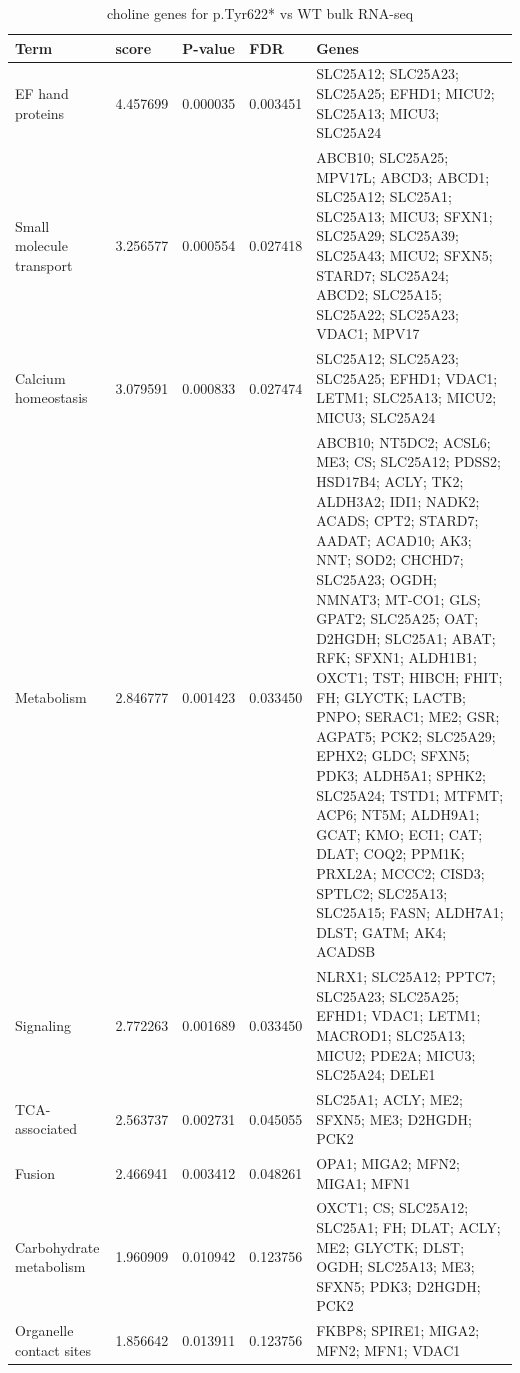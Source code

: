 \documentclass[12pt]{article}
\begin{document}
\begin{longtable}{p{5cm} p{2cm} p{1.5cm} p{1.5cm} p{7cm}}
    \caption{choline genes for p.Tyr622* vs WT bulk RNA-seq} \\
    \hline
    \textbf{Term} & \textbf{score} & \textbf{P-value} & \textbf{FDR} & \textbf{Genes} \\
    \hline
    \hline
    EF hand proteins & 4.457699 & 0.000035 & 0.003451 & SLC25A12; SLC25A23; SLC25A25; EFHD1; MICU2; SLC25A13; MICU3; SLC25A24 \\
    \hline
    Small molecule transport & 3.256577 & 0.000554 & 0.027418 & ABCB10; SLC25A25; MPV17L; ABCD3; ABCD1; SLC25A12; SLC25A1; SLC25A13; MICU3; SFXN1; SLC25A29; SLC25A39; SLC25A43; MICU2; SFXN5; STARD7; SLC25A24; ABCD2; SLC25A15; SLC25A22; SLC25A23; VDAC1; MPV17 \\
    \hline
    Calcium homeostasis & 3.079591 & 0.000833 & 0.027474 & SLC25A12; SLC25A23; SLC25A25; EFHD1; VDAC1; LETM1; SLC25A13; MICU2; MICU3; SLC25A24 \\
    \hline
    Metabolism & 2.846777 & 0.001423 & 0.033450 & ABCB10; NT5DC2; ACSL6; ME3; CS; SLC25A12; PDSS2; HSD17B4; ACLY; TK2; ALDH3A2; IDI1; NADK2; ACADS; CPT2; STARD7; AADAT; ACAD10; AK3; NNT; SOD2; CHCHD7; SLC25A23; OGDH; NMNAT3; MT-CO1; GLS; GPAT2; SLC25A25; OAT; D2HGDH; SLC25A1; ABAT; RFK; SFXN1; ALDH1B1; OXCT1; TST; HIBCH; FHIT; FH; GLYCTK; LACTB; PNPO; SERAC1; ME2; GSR; AGPAT5; PCK2; SLC25A29; EPHX2; GLDC; SFXN5; PDK3; ALDH5A1; SPHK2; SLC25A24; TSTD1; MTFMT; ACP6; NT5M; ALDH9A1; GCAT; KMO; ECI1; CAT; DLAT; COQ2; PPM1K; PRXL2A; MCCC2; CISD3; SPTLC2; SLC25A13; SLC25A15; FASN; ALDH7A1; DLST; GATM; AK4; ACADSB \\
    \hline
    Signaling & 2.772263 & 0.001689 & 0.033450 & NLRX1; SLC25A12; PPTC7; SLC25A23; SLC25A25; EFHD1; VDAC1; LETM1; MACROD1; SLC25A13; MICU2; PDE2A; MICU3; SLC25A24; DELE1 \\
    \hline
    TCA-associated & 2.563737 & 0.002731 & 0.045055 & SLC25A1; ACLY; ME2; SFXN5; ME3; D2HGDH; PCK2 \\
    \hline
    Fusion & 2.466941 & 0.003412 & 0.048261 & OPA1; MIGA2; MFN2; MIGA1; MFN1 \\
    \hline
    Carbohydrate metabolism & 1.960909 & 0.010942 & 0.123756 & OXCT1; CS; SLC25A12; SLC25A1; FH; DLAT; ACLY; ME2; GLYCTK; DLST; OGDH; SLC25A13; ME3; SFXN5; PDK3; D2HGDH; PCK2 \\
    \hline
    Organelle contact sites & 1.856642 & 0.013911 & 0.123756 & FKBP8; SPIRE1; MIGA2; MFN2; MFN1; VDAC1 \\

\end{longtable}
\end{document}
